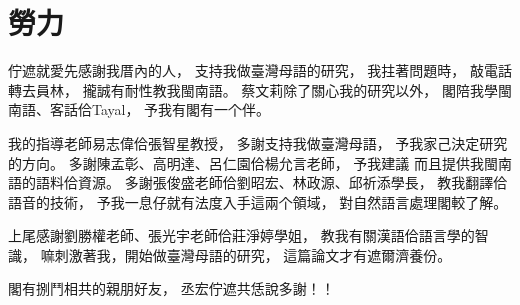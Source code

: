 \chapter{勞力}
佇遮就愛先感謝我厝內的人，
支持我做臺灣母語的研究，
我拄著問題時，
敲電話轉去員林，
攏誠有耐性教我閩南語。
蔡文莉除了關心我的研究以外，
閣陪我學閩南語、客話佮Tayal，
予我有閣有一个伴。

我的指導老師易志偉佮張智星教授，
多謝支持我做臺灣母語，
予我家己決定研究的方向。
多謝陳孟彰、高明達、呂仁園佮楊允言老師，
予我建議
而且提供我閩南語的語料佮資源。
多謝張俊盛老師佮劉昭宏、林政源、邱祈添學長，
教我翻譯佮語音的技術，
予我一息仔就有法度入手這兩个領域，
對自然語言處理閣較了解。

上尾感謝劉勝權老師、張光宇老師佮莊淨婷學姐，
教我有關漢語佮語言學的智識，
嘛刺激著我，開始做臺灣母語的研究，
這篇論文才有遮爾濟養份。

閣有捌鬥相共的親朋好友，
丞宏佇遮共恁說多謝！！